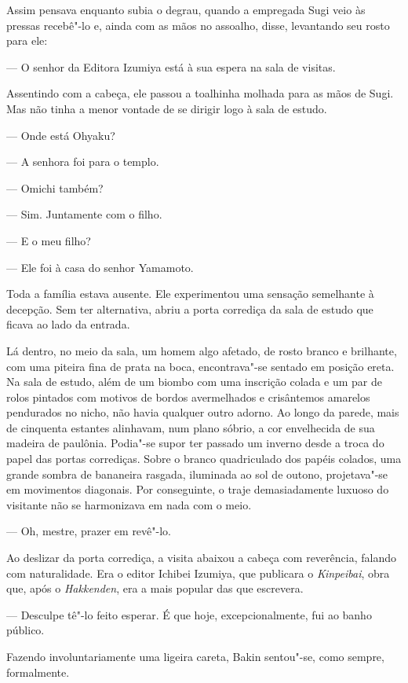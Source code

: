 Assim pensava enquanto subia o degrau, quando a empregada Sugi veio às
pressas recebê"-lo e, ainda com as mãos no assoalho, disse, levantando
seu rosto para ele:

--- O senhor da Editora Izumiya está à sua espera na sala de visitas.

Assentindo com a cabeça, ele passou a toalhinha molhada para as mãos de
Sugi. Mas não tinha a menor vontade de se dirigir logo à sala de
estudo.

--- Onde está Ohyaku?

--- A senhora foi para o templo.

--- Omichi também?

--- Sim. Juntamente com o filho.

--- E o meu filho?

--- Ele foi à casa do senhor Yamamoto.

Toda a família estava ausente. Ele experimentou uma sensação semelhante
à decepção. Sem ter alternativa, abriu a porta corrediça da sala de
estudo que ficava ao lado da entrada.

Lá dentro, no meio da sala, um homem algo afetado, de rosto branco e 
brilhante, com uma piteira fina de prata na boca, encontrava"-se sentado
em posição ereta. Na sala de estudo, além de um biombo com uma
inscrição colada e um par de rolos pintados com motivos de bordos
avermelhados e crisântemos amarelos pendurados no nicho, não havia
qualquer outro adorno. Ao longo da parede, mais de cinquenta estantes
alinhavam, num plano sóbrio, a cor envelhecida de sua madeira de
paulônia. Podia"-se supor ter passado um inverno desde a troca do papel
das portas corrediças. Sobre o branco quadriculado dos papéis colados,
uma grande sombra de bananeira rasgada, iluminada ao sol de outono,
projetava"-se em movimentos diagonais. Por conseguinte, o traje
demasiadamente luxuoso do visitante não se harmonizava em nada com o meio.

--- Oh, mestre, prazer em revê"-lo.

Ao deslizar da porta corrediça, a visita abaixou a cabeça com
reverência, falando com naturalidade. Era o editor Ichibei Izumiya, que 
publicara o \textit{Kinpeibai}, obra que, após o \textit{Hakkenden},
era a mais popular das que escrevera.

--- Desculpe tê"-lo feito esperar. É que hoje, excepcionalmente, fui ao
banho público.

Fazendo involuntariamente uma ligeira careta, Bakin sentou"-se, como
sempre, formalmente.

